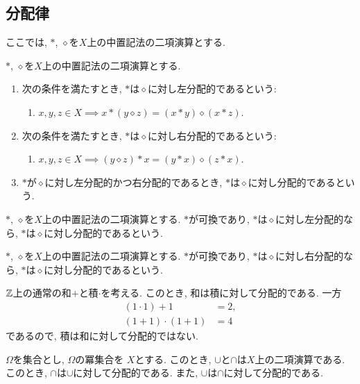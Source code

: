 \subsection{分配律}
ここでは, $\ast$, $\diamond$を$X$上の中置記法の二項演算とする.
\begin{definition}
  $\ast$, $\diamond$を$X$上の中置記法の二項演算とする.
  \begin{enumerate}
  \item 次の条件を満たすとき,
    $\ast$は$\diamond$に対し左分配的であるという:
    \begin{enumerate}
      \item $x,y,z\in X \implies x\ast (y\diamond z)=(x\ast y)\diamond (x\ast z)$.
    \end{enumerate}
  \item 次の条件を満たすとき,
    $\ast$は$\diamond$に対し右分配的であるという:
    \begin{enumerate}
      \item $x,y,z\in X \implies (y\diamond z) \ast x=(y\ast x)\diamond (z\ast x)$.
    \end{enumerate}
  \item 
    $\ast$が$\diamond$に対し左分配的かつ右分配的であるとき,
    $\ast$は$\diamond$に対し分配的であるという.
  \end{enumerate}
\end{definition}

\begin{cor}
  $\ast$, $\diamond$を$X$上の中置記法の二項演算とする.
  $\ast$が可換であり,
  $\ast$は$\diamond$に対し左分配的なら,
  $\ast$は$\diamond$に対し分配的であるという.
\end{cor}
\begin{cor}
  $\ast$, $\diamond$を$X$上の中置記法の二項演算とする.
  $\ast$が可換であり,
  $\ast$は$\diamond$に対し右分配的なら,
  $\ast$は$\diamond$に対し分配的であるという.
\end{cor}
\begin{example}
  $\mathbb{Z}$上の通常の和$+$と積$\cdot$を考える.
  このとき, 和は積に対して分配的である.
  一方
  \begin{align*}
    (1\cdot 1)+1&=2,\\
    (1+1)\cdot(1+1)&=4
  \end{align*}
  であるので, 積は和に対して分配的ではない.
\end{example}
\begin{example}
  $\Omega$を集合とし,
  $\Omega$の冪集合を
  $X$とする.
  このとき,
  $\cup$と$\cap$は$X$上の二項演算である.
  このとき,
  $\cap$は$\cup$に対して分配的である.
  また,
  $\cup$は$\cap$に対して分配的である.
\end{example}


